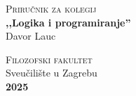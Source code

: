 \begin{titlepage}
    \vfill %

    {\large\scshape Priručnik za kolegij}\\[0.5cm]
    {\Large\bfseries ,,Logika i programiranje''}\\[1.5cm]
    {\huge Davor Lauc}

    \vfill %

    \begin{center}
        {\large\scshape Filozofski fakultet}\\[0.3cm]
        {\small Sveučilište u Zagrebu}\\[1cm]
        {\huge\bfseries 2025}
    \end{center}

    \vspace*{1cm} %

\end{titlepage}